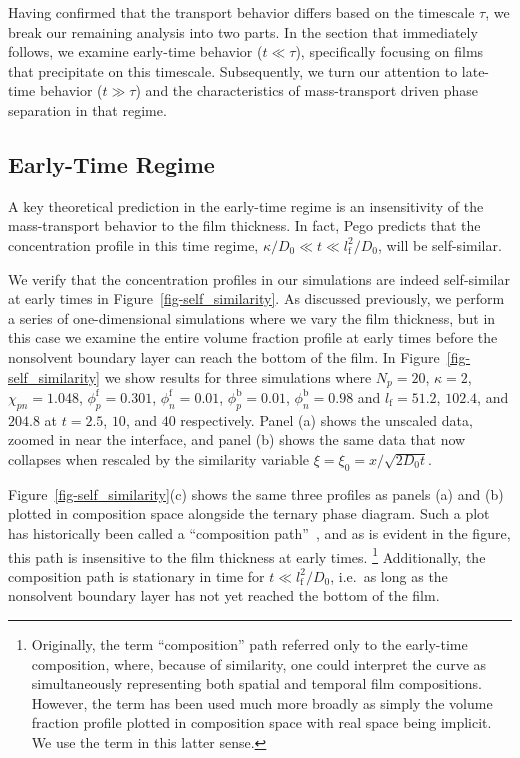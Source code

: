 \documentclass[journal=mamobx, layout=twocolumn]{achemso}
\newcommand{\txtf}{\mathrm{f}}
\newcommand{\txtb}{\mathrm{b}}
\begin{document}
Having confirmed that the transport behavior differs based on the timescale $\tau$, we break our remaining analysis into two parts.
In the section that immediately follows, we examine early-time behavior ($t \ll \tau$), specifically focusing on films that precipitate on this timescale.
Subsequently, we turn our attention to late-time behavior ($t \gg \tau$) and the characteristics of mass-transport driven phase separation in that regime.

\subsection{Early-Time Regime}
A key theoretical prediction in the early-time regime is an insensitivity of the mass-transport behavior to the film thickness.
In fact, Pego predicts that the concentration profile in this time regime, $\kappa/D_{0} \ll t \ll l_{\txtf}^{2}/D_{0}$, will be self-similar.

We verify that the concentration profiles in our simulations are indeed self-similar at early times in Figure~\ref{fig-self_similarity}.
As discussed previously, we perform a series of one-dimensional simulations where we vary the film thickness, but in this case we examine the entire volume fraction profile at early times before the nonsolvent boundary layer can reach the bottom of the film.
In Figure~\ref{fig-self_similarity} we show results for three simulations where $N_{p} = 20$, $\kappa = 2$, $\chi_{pn} = 1.048$, $\phi_{p}^{\txtf} = 0.301$, $\phi_{n}^{\txtf} = 0.01$, $\phi_{p}^{\txtb} = 0.01$, $\phi_{n}^{\txtb} = 0.98$ and $l_{\txtf} = 51.2$, $102.4$, and $204.8$ at $t = 2.5$, $10$, and $40$ respectively.
Panel (a) shows the unscaled data, zoomed in near the interface, and panel (b) shows the same data that now collapses when rescaled by the similarity variable $\xi = \xi_{0} = x/\sqrt{2 D_{0} t}$.

Figure~\ref{fig-self_similarity}(c) shows the same three profiles as panels (a) and (b) plotted in composition space alongside the ternary phase diagram.
Such a plot has historically been called a ``composition path''~\cite{Reuvers1987,Tsay1990}, and as is evident in the figure, this path is insensitive to the film thickness at early times.%
\footnote{
Originally, the term ``composition'' path referred only to the early-time composition, where, because of similarity, one could interpret the curve as simultaneously representing both spatial and temporal film compositions.
However, the term has been used much more broadly as simply the volume fraction profile plotted in composition space with real space being implicit.
We use the term in this latter sense.
}
Additionally, the composition path is stationary in time for $t \ll l_{\txtf}^{2}/D_{0}$, i.e.\ as long as the nonsolvent boundary layer has not yet reached the bottom of the film.
\end{document}
